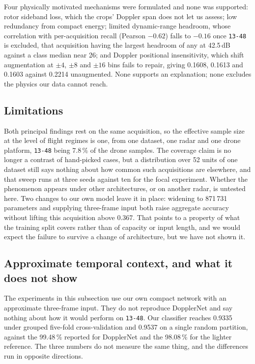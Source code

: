 \documentclass[conference]{IEEEtran}
\begin{document}
Four physically motivated mechanisms were formulated and none was supported: rotor sideband loss, which the crops' Doppler span does not let us assess; low redundancy from compact energy; limited dynamic-range headroom, whose correlation with per-acquisition recall (Pearson $-0.62$) falls to $-0.16$ once \texttt{13-48} is excluded, that acquisition having the largest headroom of any at 42.5\,dB against a class median near 26; and Doppler positional insensitivity, which shift augmentation at $\pm 4$, $\pm 8$ and $\pm 16$ bins fails to repair, giving 0.1608, 0.1613 and 0.1603 against 0.2214 unaugmented. None supports an explanation; none excludes the physics our data cannot reach.

\subsection{Limitations}

Both principal findings rest on the same acquisition, so the effective sample size at the level of flight regimes is one, from one dataset, one radar and one drone platform, \texttt{13-48} being 7.8\,\% of the drone samples. The coverage claim is no longer a contrast of hand-picked cases, but a distribution over 52 units of one dataset still says nothing about how common such acquisitions are elsewhere, and that sweep runs at three seeds against ten for the focal experiment. Whether the phenomenon appears under other architectures, or on another radar, is untested here. Two changes to our own model leave it in place: widening to 871\,731 parameters and supplying three-frame input both raise aggregate accuracy without lifting this acquisition above 0.367. That points to a property of what the training split covers rather than of capacity or input length, and we would expect the failure to survive a change of architecture, but we have not shown it.

\subsection{Approximate temporal context, and what it does not show}
\label{sec:inputgap}

The experiments in this subsection use our own compact network with an approximate three-frame input. They do not reproduce DopplerNet and say nothing about how it would perform on \texttt{13-48}. Our classifier reaches 0.9335 under grouped five-fold cross-validation and 0.9537 on a single random partition, against the 99.48\,\% reported for DopplerNet and the 98.08\,\% for the lighter reference. The three numbers do not measure the same thing, and the differences run in opposite directions.
\end{document}
